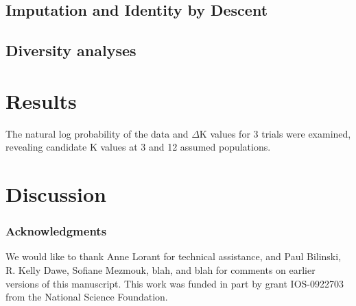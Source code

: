 \documentclass[12pt]{article}
\begin{document}
\subsection{Imputation and Identity by Descent} %


\subsection{Diversity analyses} %


\section{Results}

The natural log probability of the data and  $\Delta$K values for 3 trials were examined, revealing candidate K values at 3 and 12 assumed populations.    

\section{Discussion}

\subsubsection*{Acknowledgments}
We would like to thank Anne Lorant for technical assistance, and Paul Bilinski, R. Kelly Dawe, Sofiane Mezmouk, blah, and blah for comments on earlier versions of this manuscript.  This work was funded in part by grant IOS-0922703 from the National Science Foundation.

\clearpage

\end{document}
